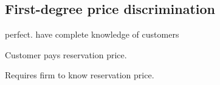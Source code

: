 
\subsection{First-degree price discrimination}

perfect. have complete knowledge of customers

Customer pays reservation price.

Requires firm to know reservation price.

